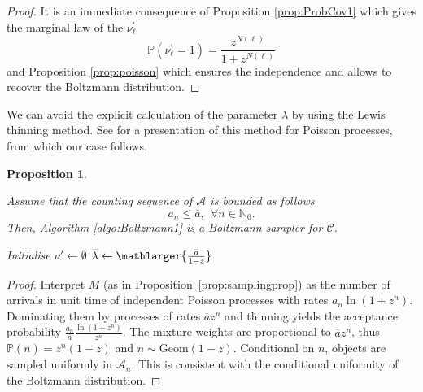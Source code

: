 \documentclass[a4paper,10pt]{article}
\newtheorem{proposition}[theorem]{Proposition}
\theoremstyle{definition}
\newcommand{\PP}{\mathbb{P}}
\newcommand{\Aa}{\mathcal{A}}
\newcommand{\Cc}{\mathcal{C}}
\newcommand{\NN}{\mathbb{N}}
\begin{document}
\begin{proof}
    It is an immediate consequence of Proposition \ref{prop:ProbCov1} which gives the marginal law of the $\nu^\prime_\ell$
    \begin{equation*}
        \PP(\nu^\prime_\ell=1)= \frac{z^{N(\ell)}}{1+z^{N(\ell)}}
    \end{equation*}
    and Proposition \ref{prop:poisson} which ensures the independence and allows to recover the Boltzmann distribution. 
\end{proof}
We can avoid the explicit calculation of the parameter $\lambda$ by using the Lewis thinning method. See \cite{Ogata} for a presentation of this method for Poisson processes, from which our case follows.

\begin{proposition}\label{prop:algo}
    
Assume that the counting sequence of $\Aa$ is bounded as follows
    \begin{equation}
        a_n\leq\overline{a},~~\forall n\in \NN_0. 
        \end{equation}
    Then, Algorithm \ref{algo:Boltzmann1} is a Boltzmann sampler for $\Cc$.
    \begin{algorithm}
    \caption{Boltzmann$(z)$}\label{algo:Boltzmann1}
    \begin{algorithmic}[1]
        \State Initialise $\nu' \leftarrow \emptyset$
        \State $\overline{\lambda} \leftarrow \mathlarger{\frac{\overline{a}}{1-z}}$
                \State{$\ell \leftarrow \text{Unif}(\Aa_n)$}
            \EndIf
        \EndFor
    \end{algorithmic}
    \end{algorithm}
\end{proposition}

\begin{proof}
Interpret $M$ (as in Proposition~\ref{prop:samplingprop}) as the number of arrivals in unit time of independent Poisson processes with rates $a_n\ln(1+z^n)$. Dominating them by processes of rates $\overline{a}z^n$ and thinning yields the acceptance probability $\frac{a_n}{\overline{a}}\frac{\ln(1+z^n)}{z^n}$. The mixture weights are proportional to $\overline{a}z^n$, thus $\PP(n)=z^n(1-z)$ and $n\sim\mathrm{Geom}(1-z)$. Conditional on $n$, objects are sampled uniformly in $\Aa_n$. This is consistent with the conditional uniformity of the Boltzmann distribution.
\end{proof}
\end{document}
